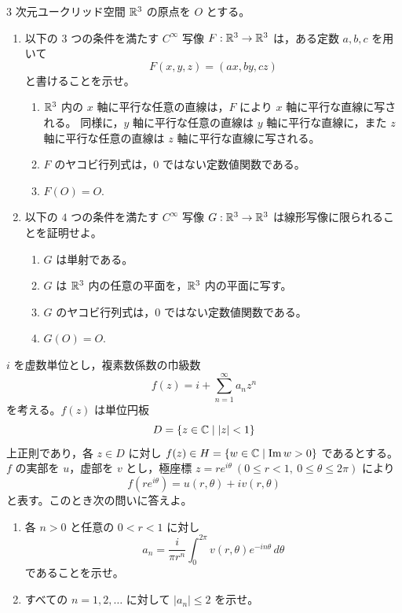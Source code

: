 
\(3\) 次元ユークリッド空間 \(\mathbb{R}^3\) の原点を \(O\) とする。

\begin{enumerate}
  \item 以下の \(3\) つの条件を満たす \(C^\infty\) 写像 \(F:\mathbb{R}^3\to\mathbb{R}^3\) は，ある定数 \(a,b,c\) を用いて
  \[
    F(x,y,z)=(ax,by,cz)
  \]
  と書けることを示せ。
  \begin{enumerate}
    \item[(i)] \(\mathbb{R}^3\) 内の \(x\) 軸に平行な任意の直線は，\(F\) により \(x\) 軸に平行な直線に写される。
    同様に，\(y\) 軸に平行な任意の直線は \(y\) 軸に平行な直線に，また \(z\) 軸に平行な任意の直線は \(z\) 軸に平行な直線に写される。
    \item[(ii)] \(F\) のヤコビ行列式は，\(0\) ではない定数値関数である。
    \item[(iii)] \(F(O)=O\).
  \end{enumerate}
  \item 以下の \(4\) つの条件を満たす \(C^\infty\) 写像 \(G:\mathbb{R}^3\to\mathbb{R}^3\) は線形写像に限られることを証明せよ。
  \begin{enumerate}
    \item[(o)] \(G\) は単射である。
    \item[(i)] \(G\) は \(\mathbb{R}^3\) 内の任意の平面を，\(\mathbb{R}^3\) 内の平面に写す。
    \item[(ii)] \(G\) のヤコビ行列式は，\(0\) ではない定数値関数である。
    \item[(iii)] \(G(O)=O\).
  \end{enumerate}
\end{enumerate}


\(i\) を虚数単位とし，複素数係数の巾級数
\[
  f(z)=i+\sum_{n=1}^{\infty}a_n z^n
\]
を考える。\(f(z)\) は単位円板
\[
  D=\{z\in\mathbb{C}\mid |z|<1\}
\]
上正則であり，各 \(z\in D\) に対し \(f(z)\in H=\{w\in\mathbb{C}\mid \operatorname{Im} w>0\}\) であるとする。
\(f\) の実部を \(u\)，虚部を \(v\) とし，極座標 \(z=re^{i\theta}\ (0\le r<1,\ 0\le \theta\le 2\pi)\) により
\[
  f(re^{i\theta})=u(r,\theta)+iv(r,\theta)
\]
と表す。このとき次の問いに答えよ。

\begin{enumerate}
  \item 各 \(n>0\) と任意の \(0<r<1\) に対し
  \[
    a_n=\frac{i}{\pi r^n}\int_{0}^{2\pi} v(r,\theta)e^{-in\theta}\,d\theta
  \]
  であることを示せ。
  \item すべての \(n=1,2,\ldots\) に対して \(|a_n|\le2\) を示せ。
\end{enumerate}

